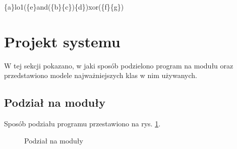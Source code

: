 \begin{center}
\{a\}lo1(\{e\}and(\{b\}\{c\})\{d\})xor(\{f\}\{g\})
\end{center}

\section{Projekt systemu}

W tej sekcji pokazano, w jaki sposób podzielono program na modułu oraz przedstawiono modele najważniejszych klas w nim używanych.

\subsection{Podział na moduły}

Sposób podziału programu przestawiono na rys. \ref{fig:modules}. 

\begin{figure}[H]
	\caption{\label{fig:modules}Podział na moduły}
\end{figure}

